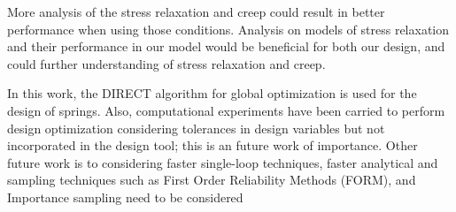 \documentclass[10pt]{article}
\begin{document}
More analysis of the stress relaxation and creep could result in better performance when using those conditions. Analysis on models of stress relaxation and their performance in our model would be beneficial for both our design, and could further understanding of stress relaxation and creep.

In this work, the DIRECT algorithm for global optimization is used for the design of springs. Also, computational experiments have been carried to perform design optimization considering tolerances in design variables but not incorporated in the design tool; this is an future work of importance. Other future work is to considering faster single-loop techniques, faster analytical and sampling techniques such as First Order Reliability Methods (FORM), and Importance sampling need to be considered


%



\end{document}
